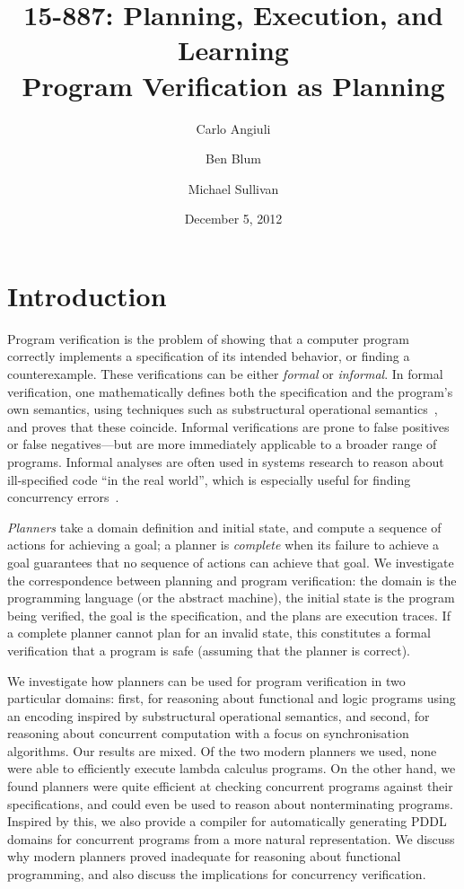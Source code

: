 \documentclass{article}
\title{
{\large 15-887: Planning, Execution, and Learning}\\
{\bf Program Verification as Planning}}
\author{Carlo Angiuli \and Ben Blum \and Michael Sullivan}
\date{December 5, 2012}
\begin{document}
\maketitle

\section{Introduction}

Program verification is the problem of showing that a computer program correctly
implements a specification of its intended behavior, or finding a
counterexample. These verifications can be either \emph{formal} or
\emph{informal}. In formal verification, one mathematically defines both the
specification and the program's own semantics, using techniques such as
substructural operational semantics~\cite{rob}, and proves that these coincide.
Informal verifications are prone to false positives or false negatives---but are
more immediately applicable to a broader range of programs. Informal analyses
are often used in systems research to reason about ill-specified code ``in the
real world'', which is especially useful for finding concurrency
errors~\cite{ben}.

{\em Planners} take a domain definition and initial state, and compute a
sequence of actions for achieving a goal; a planner is {\em complete} when its
failure to achieve a goal guarantees that no sequence of actions can achieve
that goal.
We investigate the correspondence between planning and program verification: the domain is the programming language (or the abstract machine), the initial state is the program being verified, the goal is the specification, and the plans are execution traces.
If a complete planner cannot plan for an invalid state, this constitutes a
formal verification that a program is safe (assuming that the planner is
correct).

We investigate how planners can be used for program verification in two particular domains:
first, for reasoning about functional and logic programs using an encoding
inspired by substructural operational semantics,
and second, for reasoning about concurrent computation with a focus on synchronisation algorithms.
Our results are mixed.
Of the two modern planners we used, none were able to efficiently execute lambda calculus programs.
On the other hand, we found planners were quite efficient at checking concurrent programs against their specifications,
and could even be used to reason about nonterminating programs.
Inspired by this, we also provide a compiler for automatically generating PDDL
domains for concurrent programs from a more natural representation.
We discuss why modern planners proved inadequate for reasoning about functional programming, and also discuss the implications for concurrency verification.
\end{document}

